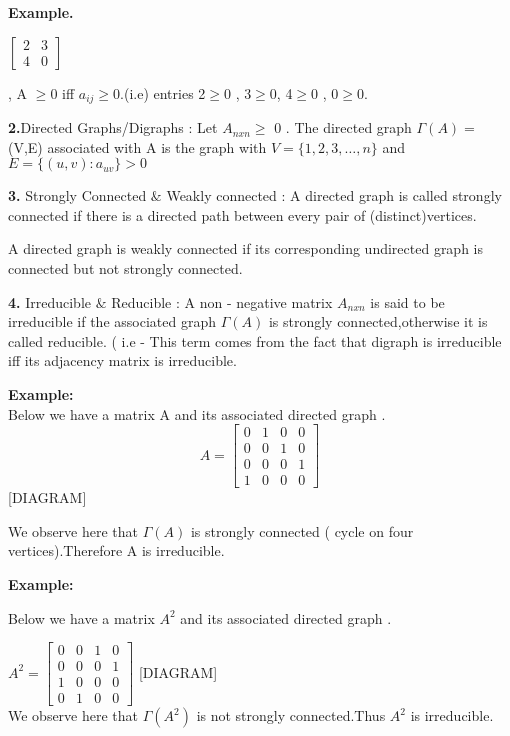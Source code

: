{\bf Example.} 

$\begin{bmatrix}2&3\\4&0\end{bmatrix}$ 

, A $\geq $0 iff $a_{ij} \geq $0.(i.e) entries 2$\geq $0 , 3$\geq $0, 4$\geq $0 , 0$\geq $0.

{\bf 2.}Directed Graphs/Digraphs : Let $A _{nxn}\geq $ 0 . The directed graph $\Gamma(A)=$ (V,E) associated with A is the 
graph with $V = \{ 1,2,3,\ldots ,n \}$ and $E=\{(u,v) : a_{uv}\} > 0$


{\bf 3.} Strongly Connected $\&$ Weakly connected : A directed graph is called strongly connected if there is a directed 
path between every pair of (distinct)vertices.

A directed graph is weakly connected if its corresponding undirected graph is connected but not strongly connected.

{\bf 4.} Irreducible $\&$ Reducible : A non - negative matrix $A_{nxn}$ is said to be irreducible if the associated graph 
$\Gamma(A)$ is strongly connected,otherwise it is called reducible. ( i.e - This term comes from the fact that digraph is 
irreducible iff its adjacency matrix is irreducible.

{\bf Example:}
\\Below we have a matrix A and its associated directed graph .
$$A= \begin{bmatrix}0&1&0&0\\ 0&0&1&0\\  0&0&0&1\\ 1&0&0&0\end{bmatrix} $$
[DIAGRAM]

We observe here that $\Gamma(A)$ is strongly connected ( cycle on four vertices).Therefore A is irreducible.

{\bf Example:}

Below we have a matrix $A^{2}$ and its associated directed graph .

$ A^{2} =
\begin{bmatrix}0&0&1&0\\ 0&0&0&1\\ 1&0&0&0\\ 0&1&0&0 \end{bmatrix} $
[DIAGRAM]
\\We observe here that $\Gamma(A^{2})$ is not strongly connected.Thus $A^{2}$ is irreducible.

